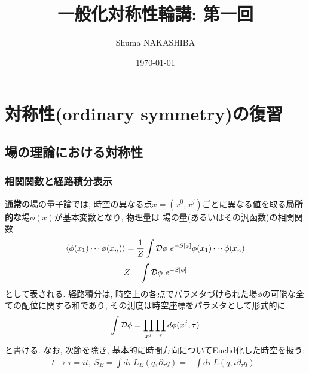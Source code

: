 \documentclass{ltjsarticle}
\title{一般化対称性輪講: 第一回}
\author{Shuma NAKASHIBA}
\date{\today}
\theoremstyle{mystyle} %
\numberwithin{equation}{section}
\begin{document}
\maketitle

\setcounter{tocdepth}{2}
\tableofcontents

\newpage
\section{対称性(ordinary symmetry)の復習}
\subsection{場の理論における対称性}
\subsubsection{相関関数と経路積分表示}
\textbf{通常の}場の量子論では, 時空の異なる点$x=(x^0, x^j)$ごとに異なる値を取る\textbf{局所的な}場$\phi(x)$が基本変数となり, 物理量は
場の量(あるいはその汎函数)の相関関数
\begin{align}
    \langle{\phi(x_1)\cdots \phi(x_n)}\rangle
    =\frac{1}{Z}\int \mathcal{D}{\phi}~ e^{-S[\phi]}\phi(x_1)\cdots \phi(x_n)
\end{align}
\begin{align}
    Z=\int \mathcal{D}{\phi}~e^{-S[\phi]}
\end{align}
として表される. 経路積分は, 時空上の各点でパラメタづけられた場$\phi$の可能な全ての配位に関する和であり, その測度は時空座標をパラメタとして形式的に
\begin{align}
    \int \mathcal{D}{\phi} = \prod_{x^j}\prod_{\tau}d\phi(x^j, \tau)
\end{align}
と書ける. なお, 次節を除き, 基本的に時間方向についてEuclid化した時空を扱う: 
\begin{align}
    t\to \tau=it, ~
    S_E = \int d\tau ~L_E (q, \partial_\tau q) = -\int d\tau ~L(q, i\partial_\tau q)~.
\end{align}
\end{document}

